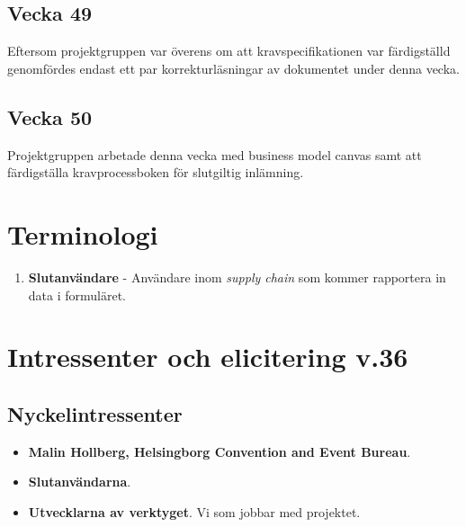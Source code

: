 \documentclass[12pt]{article}
\begin{document}
 \subsection{Vecka 49}
 Eftersom projektgruppen var överens om att kravspecifikationen var färdigställd genomfördes endast ett par korrekturläsningar av dokumentet under denna vecka.
 
 \subsection{Vecka 50}
 Projektgruppen arbetade denna vecka med business model canvas samt att färdigställa kravprocessboken för slutgiltig inlämning.
 
 

  
    \newpage
    
\section{Terminologi}
    \begin{enumerate}
        \item \textbf{Slutanvändare} - Användare inom \textit{supply chain} som kommer rapportera in data i formuläret.
        
    \end{enumerate}
    

\section{Intressenter och elicitering v.36}

    \subsection{Nyckelintressenter}
        \begin{itemize}
            \item \textbf{Malin Hollberg, Helsingborg Convention and Event Bureau}.
                \\
            \item \textbf{Slutanvändarna}.
                \\
             \item \textbf{Utvecklarna av verktyget}. Vi som jobbar med projektet.
                \\
        \end{itemize}
        
\end{document}
